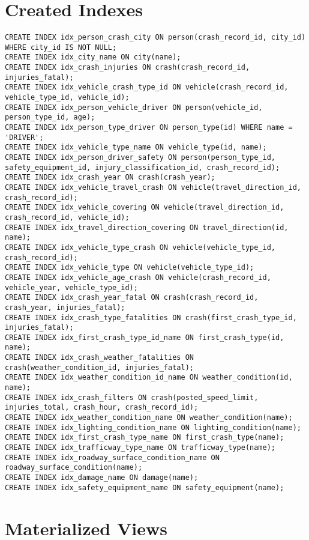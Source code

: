 \documentclass[12pt]{article}
\begin{document}
\section{Created Indexes}
{\scriptsize
\begin{verbatim}
CREATE INDEX idx_person_crash_city ON person(crash_record_id, city_id) WHERE city_id IS NOT NULL;
CREATE INDEX idx_city_name ON city(name);
CREATE INDEX idx_crash_injuries ON crash(crash_record_id, injuries_fatal);
CREATE INDEX idx_vehicle_crash_type_id ON vehicle(crash_record_id, vehicle_type_id, vehicle_id);
CREATE INDEX idx_person_vehicle_driver ON person(vehicle_id, person_type_id, age);
CREATE INDEX idx_person_type_driver ON person_type(id) WHERE name = 'DRIVER';
CREATE INDEX idx_vehicle_type_name ON vehicle_type(id, name);
CREATE INDEX idx_person_driver_safety ON person(person_type_id, safety_equipment_id, injury_classification_id, crash_record_id);
CREATE INDEX idx_crash_year ON crash(crash_year);
CREATE INDEX idx_vehicle_travel_crash ON vehicle(travel_direction_id, crash_record_id);
CREATE INDEX idx_vehicle_covering ON vehicle(travel_direction_id, crash_record_id, vehicle_id);
CREATE INDEX idx_travel_direction_covering ON travel_direction(id, name);
CREATE INDEX idx_vehicle_type_crash ON vehicle(vehicle_type_id, crash_record_id);
CREATE INDEX idx_vehicle_type ON vehicle(vehicle_type_id);
CREATE INDEX idx_vehicle_age_crash ON vehicle(crash_record_id, vehicle_year, vehicle_type_id);
CREATE INDEX idx_crash_year_fatal ON crash(crash_record_id, crash_year, injuries_fatal);
CREATE INDEX idx_crash_type_fatalities ON crash(first_crash_type_id, injuries_fatal);
CREATE INDEX idx_first_crash_type_id_name ON first_crash_type(id, name);
CREATE INDEX idx_crash_weather_fatalities ON crash(weather_condition_id, injuries_fatal);
CREATE INDEX idx_weather_condition_id_name ON weather_condition(id, name);
CREATE INDEX idx_crash_filters ON crash(posted_speed_limit, injuries_total, crash_hour, crash_record_id);
CREATE INDEX idx_weather_condition_name ON weather_condition(name);
CREATE INDEX idx_lighting_condition_name ON lighting_condition(name);
CREATE INDEX idx_first_crash_type_name ON first_crash_type(name);
CREATE INDEX idx_trafficway_type_name ON trafficway_type(name);
CREATE INDEX idx_roadway_surface_condition_name ON roadway_surface_condition(name);
CREATE INDEX idx_damage_name ON damage(name);
CREATE INDEX idx_safety_equipment_name ON safety_equipment(name);
\end{verbatim}}


\section{Materialized Views}
\end{document}

